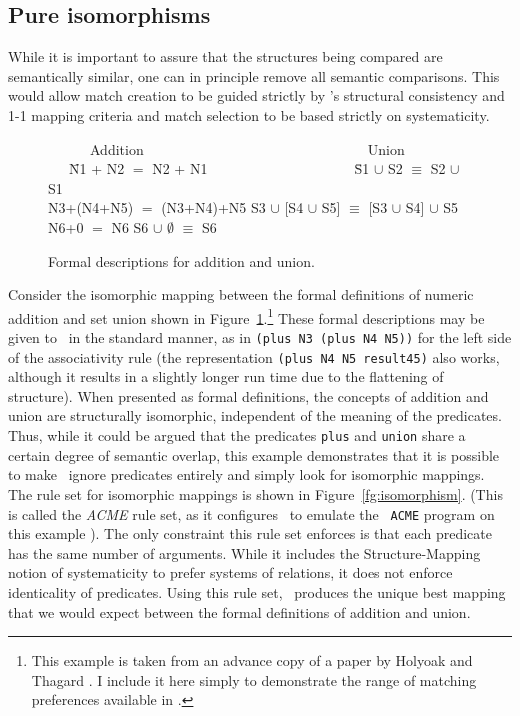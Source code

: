 \subsection{Pure isomorphisms}\label{ss:isomorphisms}

While it is important to assure that the structures being compared are
semantically similar, one can in principle remove all semantic comparisons.
This would allow match creation to be guided strictly by \SME's structural
consistency and 1-1 mapping criteria and match selection to be based
strictly on systematicity.

\begin{figure}
\border
\begin{small}
\begin{tt}
\begin{tabbing}
\ \ \ \ \ \ {\rm Addition}\ \ \ \ \ \ \ \ \ \ \ \ \ \ \ \ \ \ \ \ \ \ \ \ \ \ \ \ \ \ \ \ {\rm Union} \\
\ \ \ \= N1 + N2 $=$ N2 + N1\ \ \ \ \ \ \ \ \ \ \ \ \ \ \ \ \ \ \ \ \ \= S1 $\cup$ S2 $\equiv$ S2 $\cup$ S1 \\
\> N3+(N4+N5) $=$ (N3+N4)+N5 \> S3 $\cup$ [S4 $\cup$ S5] $\equiv$ [S3 $\cup$ S4] $\cup$ S5 \\
\> N6+0 $=$ N6            \> S6 $\cup$ $\emptyset$ $\equiv$ S6
\end{tabbing}
\end{tt}
\end{small}
  \caption{Formal descriptions for addition and union.}
  \label{fg:addition-union}
\border
\end{figure}


Consider the isomorphic mapping between the formal definitions of numeric
addition and set union shown in
Figure~\ref{fg:addition-union}.\footnote{This example is taken from an
advance copy of a paper by Holyoak and Thagard \cite{ACME}. I include it
here simply to demonstrate the range of matching preferences available in
\SME.} These formal descriptions may be given to \SME\ in the standard
manner, as in {\tt (plus N3 (plus N4 N5))} for the left side of the
associativity rule (the representation {\tt (plus N4 N5 result45)} also
works, although it results in a slightly longer run time due to the
flattening of structure).  When presented as formal definitions, the
concepts of addition and union are structurally isomorphic, independent of
the meaning of the predicates. Thus, while it could be argued that the
predicates {\tt plus} and {\tt union} share a certain degree of semantic
overlap, this example demonstrates that it is possible to make \SME\ ignore
predicates entirely and simply look for isomorphic mappings.  The rule set
for isomorphic mappings is shown in Figure~\ref{fg:isomorphism}. (This is
called the {\it ACME} rule set, as it configures \SME\ to emulate the {\tt
ACME} program on this example \cite{ACME}). The only constraint this rule
set enforces is that each predicate has the same number of arguments. While
it includes the Structure-Mapping notion of systematicity to prefer systems
of relations, it does not enforce identicality of predicates.  Using this
rule set, \SME\ produces the unique best mapping that we would expect
between the formal definitions of addition and union.

